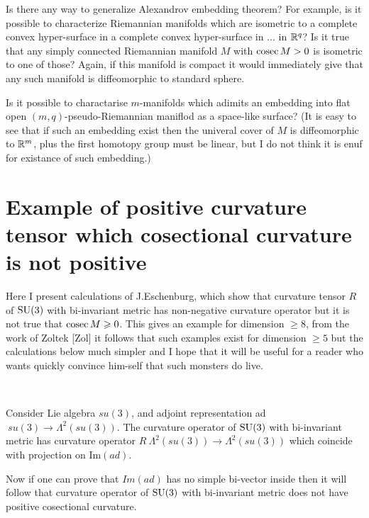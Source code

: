 \documentclass{article}
\begin{document}
Is there any way to generalize Alexandrov embedding theorem? For
example, is it possible to characterize Riemannian manifolds which
are isometric to a complete convex hyper-surface in a complete
convex hyper-surface in ... in $\mathbb{R}^q$? 
Is it true that any simply
connected Riemannian manifold $M$ with $\mathop{\rm cosec}\nolimits M>0$ is isometric to one of
those? 
Again, if this manifold is compact it would immediately
give that any such manifold is diffeomorphic to standard sphere.


Is it possible to charactarise $m$-manifolds which adimits an embedding 
into flat open $(m,q)$-pseudo-Riemannian maniflod as a space-like surface?
(It is easy to see that if such an embedding exist then 
the univeral cover of $M$ is diffeomorphic to $\mathbb{R}^m$, plus the first homotopy group must be linear, but I do not think it is enuf for existance of such embedding.)













\appendix
\section{Example of positive curvature tensor which cosectional curvature is not positive}




Here I present calculations of J.Eschenburg, which show that
curvature tensor $R$ of $\text{\rm SU}(3)$ with bi-invariant metric has
non-negative curvature operator but it is not true that $\mathop{\rm cosec}\nolimits M\geqslant 0$.
This gives an example for dimension $\ge 8$, from the work of
Zoltek [Zol] it follows that such examples exist for dimension
$\ge 5$ but the calculations below much simpler and I hope that it
will be useful for a reader who wants quickly convince him-self
that such monsters do live.

\

Consider Lie algebra $su(3)$, and adjoint representation
ad$\:su(3)\to \Lambda^2(su(3))$. The curvature operator of $\text{\rm SU}(3)$
with bi-invariant metric has curvature operator
$R\:\Lambda^2(su(3))\to \Lambda^2(su(3))$ which coincide with
projection on Im$(ad)$.

Now if one can prove that $Im(ad)$ has no simple bi-vector inside
then it will follow that curvature operator of $\text{\rm SU}(3)$ with bi-invariant metric
does not have positive cosectional curvature.
\end{document}

